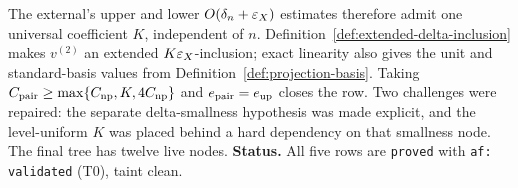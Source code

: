 The external's upper and lower $O(\delta_n+\varepsilon_X)$ estimates therefore admit one
universal coefficient $K$, independent of $n$.  Definition~\ref{def:extended-delta-inclusion}
makes $v^{(2)}$ an extended $K\varepsilon_X$-inclusion; exact linearity also gives the unit and
standard-basis values from Definition~\ref{def:projection-basis}.  Taking
$C_{\rm pair}\ge\max\{C_{\rm np},K,4C_{\rm np}\}$ and $e_{\rm pair}=e_{\rm up}$ closes
the row.  Two challenges were repaired: the separate delta-smallness hypothesis was made
explicit, and the level-uniform $K$ was placed behind a hard dependency on that smallness
node.  The final tree has twelve live nodes.
\medskip
\noindent\textbf{Status.} All five rows are \texttt{proved} with \texttt{af: validated} (T0), taint clean.
